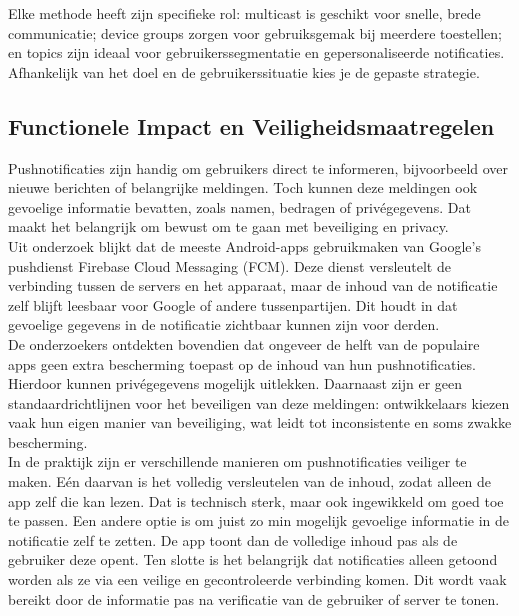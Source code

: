 Elke methode heeft zijn specifieke rol: multicast is geschikt voor snelle, brede communicatie; device groups zorgen voor gebruiksgemak bij meerdere toestellen; en topics zijn ideaal voor gebruikerssegmentatie en gepersonaliseerde notificaties. Afhankelijk van het doel en de gebruikerssituatie kies je de gepaste strategie.


\subsection{Functionele Impact en Veiligheidsmaatregelen}

Pushnotificaties zijn handig om gebruikers direct te informeren, bijvoorbeeld over nieuwe berichten of belangrijke meldingen. Toch kunnen deze meldingen ook gevoelige informatie bevatten, zoals namen, bedragen of privégegevens. Dat maakt het belangrijk om bewust om te gaan met beveiliging en privacy.\\

Uit onderzoek blijkt dat de meeste Android-apps gebruikmaken van Google’s pushdienst Firebase Cloud Messaging (FCM)\autocite{Neteler2024}. Deze dienst versleutelt de verbinding tussen de servers en het apparaat, maar de inhoud van de notificatie zelf blijft leesbaar voor Google of andere tussenpartijen. Dit houdt in dat gevoelige gegevens in de notificatie zichtbaar kunnen zijn voor derden.\\

De onderzoekers ontdekten bovendien dat ongeveer de helft van de populaire apps geen extra bescherming toepast op de inhoud van hun pushnotificaties. Hierdoor kunnen privégegevens mogelijk uitlekken\autocite{Neteler2024}. Daarnaast zijn er geen standaardrichtlijnen voor het beveiligen van deze meldingen: ontwikkelaars kiezen vaak hun eigen manier van beveiliging, wat leidt tot inconsistente en soms zwakke bescherming\autocite{Neteler2024}.\\

In de praktijk zijn er verschillende manieren om pushnotificaties veiliger te maken. Eén daarvan is het volledig versleutelen van de inhoud, zodat alleen de app zelf die kan lezen. Dat is technisch sterk, maar ook ingewikkeld om goed toe te passen. Een andere optie is om juist zo min mogelijk gevoelige informatie in de notificatie zelf te zetten. De app toont dan de volledige inhoud pas als de gebruiker deze opent. Ten slotte is het belangrijk dat notificaties alleen getoond worden als ze via een veilige en gecontroleerde verbinding komen. Dit wordt vaak bereikt door de informatie pas na verificatie van de gebruiker of server te tonen.\\

